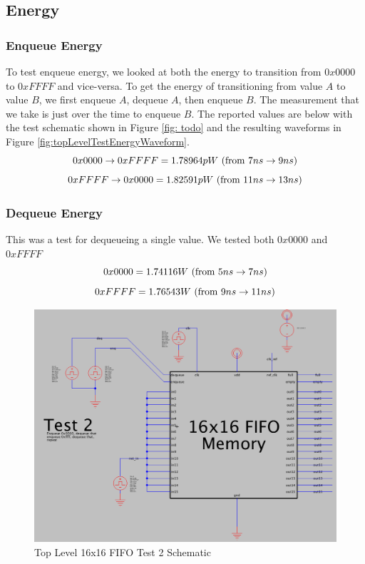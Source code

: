 \documentclass[a4paper]{article}
\begin{document}
\subsection{Energy}
\subsubsection{Enqueue Energy}
To test enqueue energy, we looked at both the energy to transition from $0x0000$ to $0xFFFF$ and vice-versa. To get the energy of transitioning from value $A$ to value $B$, we first enqueue $A$, dequeue $A$, then enqueue $B$. The measurement that we take is just over the time to enqueue $B$. The reported values are below with the test schematic shown in Figure \ref{fig: todo} and the resulting waveforms in Figure \ref{fig:topLevelTestEnergyWaveform}.
$$0x0000 \rightarrow 0xFFFF = 1.78964pW\textnormal{ (from $7ns \rightarrow 9ns$)}$$
$$0xFFFF \rightarrow 0x0000 = 1.82591pW\textnormal{ (from $11ns \rightarrow 13ns$)}$$
\subsubsection{Dequeue Energy}
This was a test for dequeueing a single value. We tested both $0x0000$ and $0xFFFF$
$$0x0000 = 1.74116W\textnormal{ (from $5ns \rightarrow 7ns$)}$$
$$0xFFFF = 1.76543W\textnormal{ (from $9ns \rightarrow 11ns$)}$$

\begin{figure}[H]
	\centering
	\includegraphics[scale=0.2]{topLevelTest2Schematic}
	\caption{Top Level 16x16 FIFO Test 2 Schematic}
	\label{fig:topLevelTest2Schematic}
\end{figure}
\end{document}

